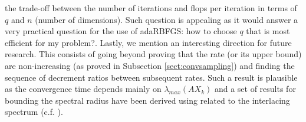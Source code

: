 \documentclass[12pt,conference,compsocconf]{IEEEtran}
\begin{document}
the trade-off between the number of iterations and flops per iteration in terms of $q$ and $n$ (number of dimensions). Such question is appealing as it would answer a very practical question for the use of adaRBFGS: how to choose $q$ that is most efficient for my problem?. Lastly, we mention an interesting direction for future research. This consists of going beyond proving that the rate (or its upper bound) are non-increasing (as proved in Subsection \ref{sect:convsampling}) and finding the sequence of decrement ratios between subsequent rates. Such a result is plausible as the convergence time depends mainly on $\lambda_{max}(AX_k)$ and a set of results for bounding the spectral radius have been derived using related to the interlacing spectrum (c.f. \cite{Mercer,Horne}).
\end{document}
